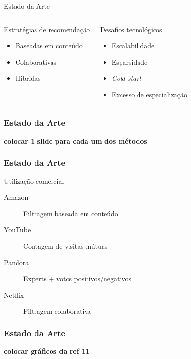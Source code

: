 \begin{frame}{Estado da Arte}
\begin{columns}[c]
\begin{block}{Estratégias de recomendação}
\begin{itemize}
	\item Baseadas em conteúdo
	\item Colaborativas
	\item Híbridas
\end{itemize}
\end{block}

\begin{block}{Desafios tecnológicos}
\begin{itemize}
	\item Escalabilidade
	\item Esparsidade
	\item \textit{Cold start}
	\item Excesso de especialização
\end{itemize}
\end{block}
\end{columns}
\end{frame}


\begin{frame}
\frametitle{Estado da Arte}
\textbf{colocar 1 slide para cada um dos métodos}
\end{frame}

\begin{frame}
\frametitle{Estado da Arte}

Utilização comercial \cite{chiang2012networked}

\begin{description}
\item[Amazon] Filtragem baseada em conteúdo
\item[YouTube] Contagem de visitas mútuas
\item[Pandora] Experts + votos positivos/negativos
\item[Netflix] Filtragem colaborativa
\end{description}
\end{frame}

\begin{frame}
\frametitle{Estado da Arte}

\textbf{colocar gráficos da ref 11}
\end{frame}


